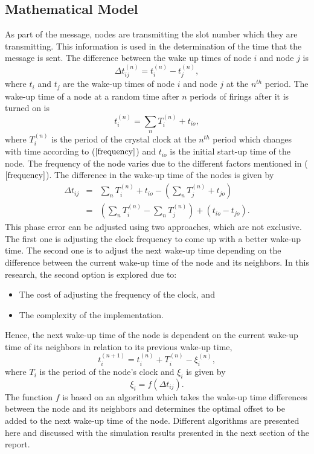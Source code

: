\documentclass[journal]{IEEEtran}
\begin{document}
\subsection{\textbf{Mathematical Model}}
\noindent As part of the message, nodes are transmitting the slot number which they are transmitting. This information is used in the determination of the time that the message is sent.\newline 
The difference between the wake up times of node $i$ and node $j$ is
\begin{equation}
\Delta t_{ij}^{(n)} = t_i^{(n)} - t_j^{(n)} ,
\end{equation}
where $t_i$ and $t_j$ are the wake-up times of node $i$ and node $j$
at the $n^{th}$ period. \newline \noindent 
The wake-up time of a node at a random time after $n$ periods of firings after it is turned on is
\begin{equation}
t_i^{(n)} = \sum_{n} T_i^{(n)} + t_{io},
\end{equation}
where  $T_i^{(n)}$ is the period of the crystal clock at the $n^{th}$ period which changes with time according to ($\ref{frequency}$) and $t_{io}$ is the initial start-up time of the node. The frequency of the node varies due to the different factors mentioned in ($\ref{frequency}$). \newline
The difference in the wake-up time of the nodes is given by
\begin{eqnarray}
\Delta t_{ij} & = & \sum_{n}T_i^{(n)} + t_{io}- (\sum_{n}T_j^{(n)} +
t_{jo}) \\ &=& (\sum_{n}T_i^{(n)} - \sum_{n}T_j^{(n)}) +
(t_{io}-t_{jo}).
\end{eqnarray}
This phase error can be adjusted using two approaches, which are not exclusive. The first
one is adjusting the clock frequency to come up with a better
wake-up time. The second one is to adjust the next wake-up time
depending on the difference between the current wake-up time of the
node and its neighbors. In this research, the second option is
explored due to:
\begin{itemize}
\item The cost of adjusting the frequency of the clock, and 
\item The complexity of the implementation.
\end{itemize}
Hence, the next wake-up time of the node is
dependent on the current wake-up time of its neighbors in relation
to its previous wake-up time,
\begin{equation}
t_i^{(n+1)} = t_i^{(n)} + T_i^{(n)} - \xi_i^{(n)} ,
\end{equation}
where $T_i$ is the period of the node's clock and $\xi_i$ is given
by
\begin{equation}
\xi_i = f(\Delta t_{ij}).
\end{equation}
The function $f$ is based on an algorithm which takes the wake-up
time differences between the node and its neighbors and determines
the optimal offset to be added to the next wake-up time of the node.
\newline Different algorithms are presented here and discussed with the
simulation results presented in the next section of the report.\newline
\end{document}
